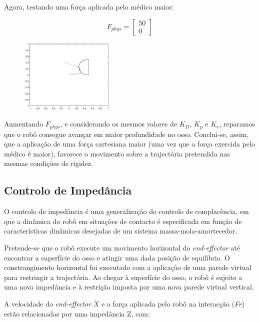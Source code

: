 \documentclass[a4paper,twocolumn,final,11pt]{article}
\begin{document}
Agora, testando uma força aplicada pelo médico maior:

\begin{equation}
F_{phys} =
    \begin{bmatrix}
    50 \\
    0
    \end{bmatrix}
\end{equation}

\begin{figure}[H]
	\centering
	\includegraphics[width=0.4\textwidth]{8_fphys_50_0.eps}
	\caption{}
  \label{}
\end{figure}

Aumentando $F_{phys}$, e considerando os mesmos valores de $K_D$, $K_p$ e $K_e$, reparamos que o robô consegue avançar em maior profundidade no osso. Conclui-se, assim, que a aplicação de uma força cartesiana maior (uma vez que a força exercida pelo médico é maior), favorece o movimento sobre a trajectória pretendida nas mesmas condições de rigidez.


\subsection{Controlo de Impedância}

O controlo de impedância é uma generalização do controlo de complacência, em que a dinâmica do robô em situações de contacto é especificada em função de características dinâmicas desejadas de um sistema massa-mola-amortecedor.

Pretende-se que o robô execute um movimento horizontal do \textit{end-effector} até encontrar a superfície do osso e atingir uma dada posição de equilíbrio.
O constrangimento horizontal foi executado com a aplicação de uma parede virtual para restringir a trajectória. Ao chegar à superfície do osso, o robô é sujeito a uma nova impedância e à restrição imposta por uma nova parede virtual vertical.

A velocidade do \textit{end-effector} $\dot{X}$ e a força aplicada pelo robô na interacção (\textit{Fe}) estão relacionadas por uma impedância Z, com:
\end{document}
